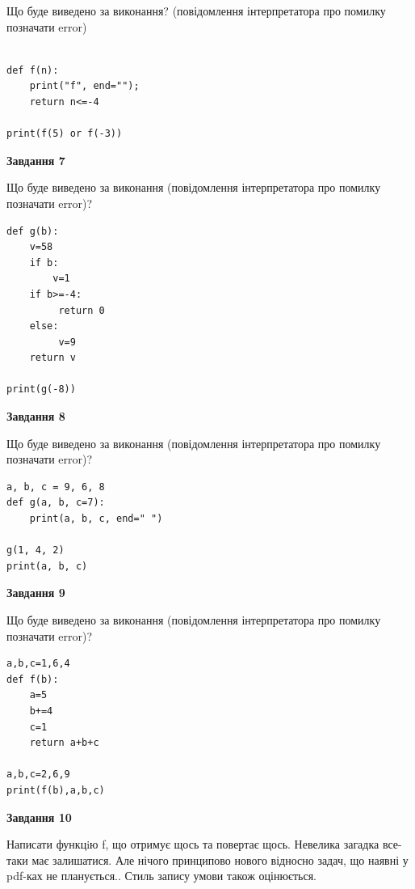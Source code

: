\documentclass[12pt, ukrainian]{article}
\begin{document}
{\begin {large}
Що буде виведено за виконання? (повідомлення інтерпретатора про помилку позначати error)\par
\begin{verbatim}

def f(n):
    print("f", end="");
    return n<=-4

print(f(5) or f(-3))
\end{verbatim}

{\begin {center}\textbf{Завдання 7}\end {center}}

Що буде виведено за виконання (повідомлення інтерпретатора про помилку позначати error)?\par
\begin{verbatim}
def g(b):
    v=58
    if b: 
        v=1
    if b>=-4:
         return 0
    else:
         v=9
    return v

print(g(-8))
\end{verbatim}

{\begin {center}\textbf{Завдання 8}\end {center}}

Що буде виведено за виконання (повідомлення інтерпретатора про помилку позначати error)?\par
\begin{verbatim}
a, b, c = 9, 6, 8
def g(a, b, c=7):
    print(a, b, c, end=" ")

g(1, 4, 2)
print(a, b, c)
\end{verbatim}

{\begin {center}\textbf{Завдання 9}\end {center}}

Що буде виведено за виконання (повідомлення інтерпретатора про помилку позначати error)?\par
\begin{verbatim}
a,b,c=1,6,4
def f(b):
    a=5
    b+=4
    c=1
    return a+b+c

a,b,c=2,6,9
print(f(b),a,b,c)
\end{verbatim}

{\begin {center}\textbf{Завдання 10}\end {center}}


Написати функцiю f, що отримує щось та повертає щось. Невелика загадка все-таки має залишатися. Але нічого принципово нового відносно задач, що наявні у pdf-ках не планується.. Стиль запису умови також оцінюється.\par
\end {large}}
\newpage
\end{document}
